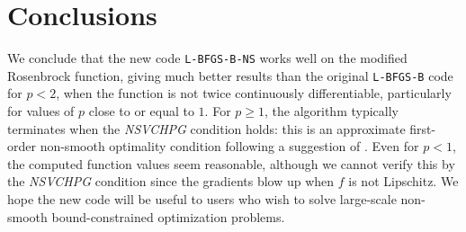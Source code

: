 \chapter*{Conclusions}

We conclude that the new code \texttt{L-BFGS-B-NS} works well on the modified Rosenbrock function, giving much better results than the original \texttt{L-BFGS-B} code for $p < 2$, when the function is not twice continuously differentiable, particularly for values of $p$ close to or equal to $1$. For $p \geq 1$, the algorithm typically terminates when the \emph{NSVCHPG} condition holds: this is an approximate first-order non-smooth optimality condition following a suggestion of \citep{overtonlewis}. Even for $p < 1$, the computed function values seem reasonable, although we cannot verify this by the \emph{NSVCHPG} condition since the gradients blow up when $f$ is not Lipschitz. We hope the new code will be useful to users who wish to solve large-scale non-smooth bound-constrained optimization problems.

\pagebreak
\pagebreak
\clearpage
